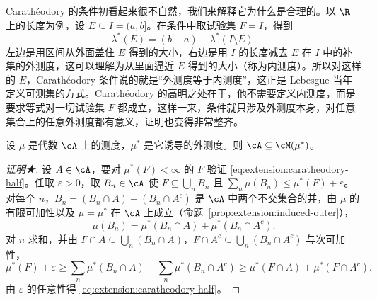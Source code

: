 \begin{remark}
Carathéodory 的条件初看起来很不自然，我们来解释它为什么是合理的。以 $\R$ 上的长度为例，设 $E\subseteq I=(a,b]$。在条件中取试验集 $F=I$，得到
\[
\lambda^*(E)=(b-a)-\lambda^*(I\setminus E).
\]
左边是用区间从外面盖住 $E$ 得到的大小，右边是用 $I$ 的长度减去 $E$ 在 $I$ 中的补集的外测度，这可以理解为从里面逼近 $E$ 得到的大小（称为内测度）。所以对这样的 $E$，Carathéodory 条件说的就是“外测度等于内测度”，这正是 Lebesgue 当年定义可测集的方式。Carathéodory 的高明之处在于，他不需要定义内测度，而是要求等式对一切试验集 $F$ 都成立，这样一来，条件就只涉及外测度本身，对任意集合上的任意外测度都有意义，证明也变得非常整齐。
\end{remark}

\begin{lemma}\label{lem:extension:algebra-measurable}
设 $\mu$ 是代数 $\cA$ 上的测度，$\mu^*$ 是它诱导的外测度。则 $\cA\subseteq\cM(\mu^*)$。
\end{lemma}
\begin{proof}[证明★]
设 $A\in\cA$，要对 $\mu^*(F)<\infty$ 的 $F$ 验证 \eqref{eq:extension:caratheodory-half}。任取 $\varepsilon>0$，取 $B_n\in\cA$ 使 $F\subseteq\bigcup_nB_n$ 且 $\sum_n\mu(B_n)\leqslant\mu^*(F)+\varepsilon$。对每个 $n$，$B_n=(B_n\cap A)+(B_n\cap A^c)$ 是 $\cA$ 中两个不交集合的并，由 $\mu$ 的有限可加性以及 $\mu=\mu^*$ 在 $\cA$ 上成立（命题~\ref{prop:extension:induced-outer}），
\[
\mu(B_n)=\mu^*(B_n\cap A)+\mu^*(B_n\cap A^c).
\]
对 $n$ 求和，并由 $F\cap A\subseteq\bigcup_n(B_n\cap A)$，$F\cap A^c\subseteq\bigcup_n(B_n\cap A^c)$ 与次可加性，
\[
\mu^*(F)+\varepsilon\geqslant\sum_n\mu^*(B_n\cap A)+\sum_n\mu^*(B_n\cap A^c)\geqslant\mu^*(F\cap A)+\mu^*(F\cap A^c).
\]
由 $\varepsilon$ 的任意性得 \eqref{eq:extension:caratheodory-half}。
\end{proof}



